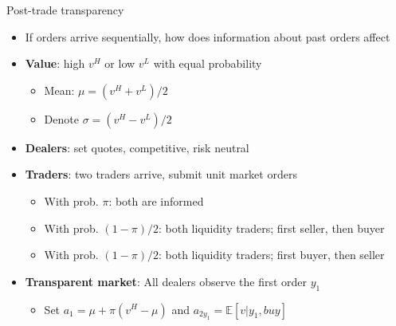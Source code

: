 \documentclass[english,10pt
,aspectratio=169
]{beamer}
\begin{document}
\begin{frame}{Post-trade transparency}
	\begin{itemize}
		\item If orders arrive sequentially, how does information about past orders affect
		\item \textbf{Value}: high $v^H$ or low $v^L$ with equal probability
		\begin{itemize}
			\item Mean: $\mu=(v^H+v^L)/2$
			\item \alert{Denote} $\sigma = (v^H-v^L)/2$
		\end{itemize}
		\item \textbf{Dealers}: set quotes, competitive, risk neutral
		\item \textbf{Traders}: two traders arrive, submit unit market orders
		\begin{itemize}
			\item With prob. $\pi$: both are informed
			\item With prob. $(1-\pi)/2$: both liquidity traders;  first  seller, then buyer
			\item With prob. $(1-\pi)/2$: both liquidity traders;  first  buyer, then seller
		\end{itemize}
		\item \textbf{Transparent market}: All dealers observe the first order $y_1$
		\begin{itemize}
			\item Set $a_1=\mu+\pi(v^{H}-\mu)$ and $a_{2y_1}=\mathbb{E}[v|y_1,buy]$
		\end{itemize}
	\end{itemize}
\end{frame}
\end{document}

